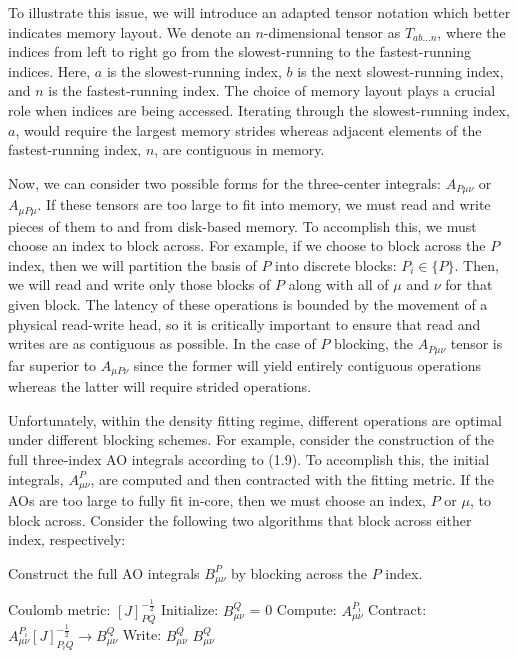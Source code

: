 To illustrate
this issue, we will introduce an adapted tensor notation which better indicates memory layout.
We denote an $n$-dimensional tensor as $T_{ab\hdots n}$, where the indices from left to right go from the slowest-running
to the fastest-running indices. Here, $a$ is the slowest-running index, $b$ is the next slowest-running
index, and $n$ is the fastest-running index. The choice of memory layout plays a crucial role when indices are being accessed.
Iterating through the slowest-running index, $a$, would require the largest memory strides whereas adjacent elements 
of the fastest-running index, $n$, are contiguous in memory. 

Now, we can consider two possible forms for the three-center integrals: $A_{P\mu\nu}$ or $A_{\mu P\mu}$.
If these tensors are too large to fit into memory, we must read and write pieces of them to and from disk-based memory.
To accomplish this, we must choose an index to block across. 
For example, if we choose to block across the $P$ index, then we will partition the basis of $P$ into discrete blocks: $P_i \in \{P\}$.
Then, we will read and write only those blocks of $P$ along with all of $\mu$ and $\nu$ for that given block.
The latency of these operations is
bounded by the movement of a physical read-write head, so it is critically important to ensure that read and writes are as
contiguous as possible. In the case of $P$ blocking, the $A_{P\mu\nu}$ tensor is far superior to $A_{\mu P \nu}$ since the 
former will yield entirely contiguous operations whereas the latter will require strided operations. 

Unfortunately, within the density fitting regime, different operations are optimal under different blocking schemes. For example,
consider the construction of the full three-index AO integrals according to (1.9). To accomplish this, 
the initial integrals, $A_{\mu \nu}^P$, are computed and then contracted with the fitting metric. If the AOs are too large to fully 
fit in-core, then we must choose an index, $P$ or $\mu$, to block across. Consider the following two algorithms
that block across either index, respectively:

\begin{algorithm}[H]
\caption{Construct the full AO integrals $B_{\mu \nu}^P$ by blocking across the $P$ index.}
\begin{algorithmic}
\REQUIRE Coulomb metric: $[J]_{PQ}^{-\frac{1}{2}}$
\STATE Initialize: $B_{\mu \nu}^Q$ = 0
    \STATE Compute:  $A_{\mu \nu}^{P_i}$
    \STATE Contract: $A_{\mu \nu}^{P_i} [J]_{P_iQ}^{-\frac{1}{2}} \rightarrow B_{\mu \nu}^Q$
    \STATE Write:    $B_{\mu \nu}^Q$ 
\ENDFOR
\RETURN $B_{\mu \nu}^Q$
\end{algorithmic}
\end{algorithm}

